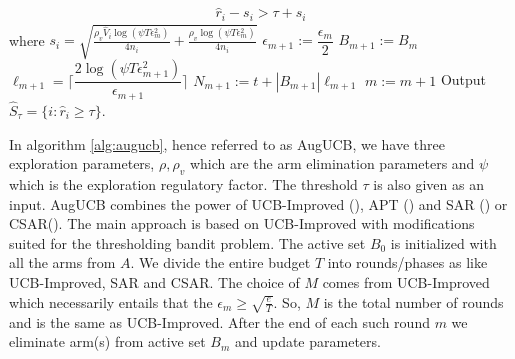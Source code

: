 \begin{algorithm}[th!]
\begin{algorithmic}
\begin{align*}
\hat{r}_{i} - s_i  > \tau + s_i
\end{align*}
where $s_i=\sqrt{\frac{\rho_v\hat{V}_{i}\log{(\psi T\epsilon_{m}^{2})}}{4 n_{i}} + \frac{\rho_v \log{(\psi T\epsilon_{m}^{2})}}{4 n_{i}}}$
\EndArmElimV
\State {}
\ResetParam
\State $\epsilon_{m+1}:=\dfrac{\epsilon_{m}}{2}$
\State $B_{m+1} := B_{m}$
\State $\ell_{m+1}=\bigg\lceil \dfrac{2\log(\psi T\epsilon_{m+1}^{2})}{\epsilon_{m+1}} \bigg\rceil$
\State $N_{m+1} := t + |B_{m+1}|\ell_{m+1}$
\State $m := m+1$
\EndResetParam
\EndIf
\EndFor
\State Output $\hat{S}_{\tau}=\lbrace i: \hat{r}_{i}\geq \tau \rbrace$.
\end{algorithmic}
\end{algorithm}

In algorithm \ref{alg:augucb}, hence referred to as AugUCB, we have three exploration parameters, $\rho, \rho_v$ which are the arm elimination parameters and $\psi$ which is the exploration regulatory factor. The threshold $\tau$ is also given as an input. AugUCB combines the power of UCB-Improved (\cite{auer2010ucb}), APT (\cite{locatelli2016optimal}) and SAR (\cite{gabillon2011multi}) or CSAR(\cite{chen2014combinatorial}). The main approach is based on UCB-Improved with modifications suited for the thresholding bandit problem. The active set $B_{0}$ is initialized with all the arms from $A$. We divide the entire budget $T$ into rounds/phases as like UCB-Improved, SAR and CSAR. The choice of $M$ comes from UCB-Improved which necessarily entails that the $\epsilon_{m}\geq \sqrt{\frac{e}{T}}$. So, $M$ is the total number of rounds and is the same as UCB-Improved. After the end of each such round $m$ we eliminate arm(s) from active set $B_{m}$ and update parameters. 
	
